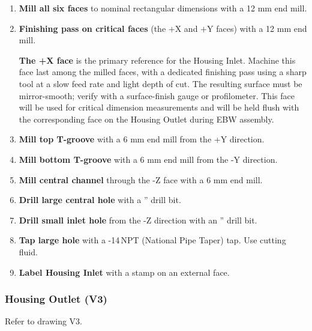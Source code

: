 \documentclass[12pt, letterpaper]{report}%
\newcounter{mycounter}           %
\newcounter{sub}[mycounter]      %
\begin{document}
\begin{appendices}
	\begin{enumerate}[itemsep=4pt]
		\item \textbf{Mill all six faces} to nominal rectangular dimensions with a 12 mm end mill.
		\item \textbf{Finishing pass on critical faces}
					(the $+$X and $+$Y faces) with a 12 mm end mill.
					\begin{notebox}
					\textbf{The +X face} is the primary reference for the Housing Inlet.
					Machine this face last among the milled faces, with a dedicated finishing pass
					using a sharp tool at a slow feed rate and light depth of cut.
					The resulting surface must be mirror-smooth; verify with a surface-finish
					gauge or profilometer. This face will be used for critical dimension measurements
					and will be held flush with the corresponding face on the Housing Outlet
					during EBW assembly.
					\end{notebox}
		\item \textbf{Mill top T-groove} with a 6 mm end mill from the +Y direction.
		\item \textbf{Mill bottom T-groove} with a 6 mm end mill from the -Y direction.
		\item \textbf{Mill central channel} through the -Z face with a 6 mm end mill.
		\item \textbf{Drill large central hole} with a '' drill bit.
		\item \textbf{Drill small inlet hole}
					from the -Z direction with an '' drill bit.
		\item \textbf{Tap large hole} with a -14\,NPT (National Pipe Taper) tap. Use cutting fluid.
		\item \textbf{Label Housing Inlet} with a stamp on an external face.
	\end{enumerate}

	\subsubsection{Housing Outlet (V3)}
	\label{sec:mfg:V3}

	Refer to drawing V3.


\end{appendices}
\end{document}
